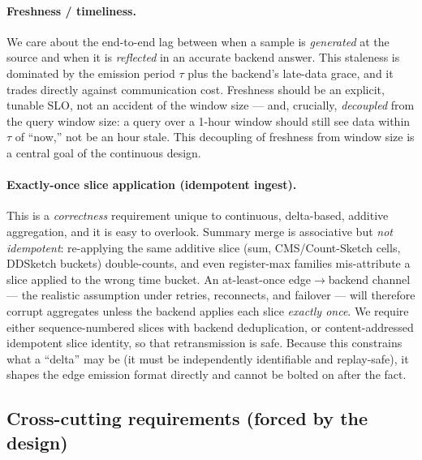 \paragraph{Freshness / timeliness.}
We care about the end-to-end lag between when a sample is \emph{generated}
at the source and when it is \emph{reflected} in an accurate backend
answer. This staleness is dominated by the emission period $\tau$ plus the
backend's late-data grace, and it trades directly against communication
cost. Freshness should be an explicit, tunable SLO, not an accident of the
window size --- and, crucially, \emph{decoupled} from the query window
size: a query over a 1-hour window should still see data within $\tau$ of
``now,'' not be an hour stale. This decoupling of freshness from window
size is a central goal of the continuous design.

\paragraph{Exactly-once slice application (idempotent ingest).}
This is a \emph{correctness} requirement unique to continuous,
delta-based, additive aggregation, and it is easy to overlook. Summary
merge is associative but \emph{not idempotent}: re-applying the same
additive slice (sum, CMS/Count-Sketch cells, DDSketch buckets)
double-counts, and even register-max families mis-attribute a slice
applied to the wrong time bucket. An at-least-once edge$\to$backend channel
--- the realistic assumption under retries, reconnects, and failover ---
will therefore corrupt aggregates unless the backend applies each slice
\emph{exactly once}. We require either sequence-numbered slices with
backend deduplication, or content-addressed idempotent slice identity, so
that retransmission is safe. Because this constrains what a ``delta'' may
be (it must be independently identifiable and replay-safe), it shapes the
edge emission format directly and cannot be bolted on after the fact.

\subsection{Cross-cutting requirements (forced by the design)}

